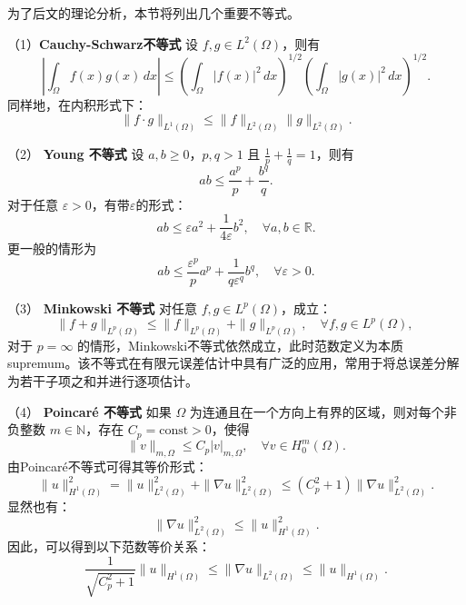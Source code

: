 \documentclass{GZUbachelorthesis}
\theoremstyle{chineseplain}
\begin{document}
为了后文的理论分析，本节将列出几个重要不等式\cite{Wang2004,li2023shuxuewuli}。

（1）\textbf{Cauchy-Schwarz不等式 } \enspace
设 \(f, g \in L^2(\Omega)\)，则有
\begin{equation}
	\left| \int_{\Omega} f(x) g(x) \, dx \right| 
	\leq \left( \int_{\Omega} |f(x)|^2 \, dx \right)^{1/2} 
	\left( \int_{\Omega} |g(x)|^2 \, dx \right)^{1/2}.
	\label{eq:cauchy1}
\end{equation}
同样地，在内积形式下：
\begin{equation}
	\|f \cdot g\|_{L^1(\Omega)} \leq \|f\|_{L^2(\Omega)} \|g\|_{L^2(\Omega)}.
	\label{eq:cauchy2}
\end{equation}

（2） \textbf{Young 不等式 } \enspace
设 \(a, b \geq 0\)，\(p, q > 1\) 且 \(\frac{1}{p} + \frac{1}{q} = 1\)，则有
\begin{equation}
	ab \leq \frac{a^p}{p} + \frac{b^q}{q}.
	\label{eq:young1}
\end{equation}
对于任意 \(\varepsilon > 0\)，有带\(\varepsilon\)的形式：
\[
ab \leq \varepsilon a^2 + \frac{1}{4\varepsilon} b^2, \quad \forall a, b \in \mathbb{R}.
\]
更一般的情形为
\begin{equation}
	ab \leq \frac{\varepsilon^p}{p} a^p + \frac{1}{q \varepsilon^q} b^q, \quad \forall \varepsilon > 0.
	\label{eq:young3}
\end{equation}

（3） \textbf{Minkowski 不等式 } \enspace
对任意 \(f, g \in L^p(\Omega)\)，成立：
\begin{equation}
	\|f + g\|_{L^p(\Omega)} \leq \|f\|_{L^p(\Omega)} + \|g\|_{L^p(\Omega)}, \quad \forall f, g \in L^p(\Omega),\ 
	\label{eq:minkowski}
\end{equation}
对于 \(p = \infty\) 的情形，Minkowski不等式依然成立，此时范数定义为本质supremum。该不等式在有限元误差估计中具有广泛的应用，常用于将总误差分解为若干子项之和并进行逐项估计。

（4） \textbf{Poincaré 不等式 } \enspace
如果 \(\Omega\) 为连通且在一个方向上有界的区域，则对每个非负整数 \(m \in \mathbb{N}\)，存在 \(C_p=\text{const} > 0\)，使得
\begin{equation}
	\|v\|_{m,\Omega} \leq C_p |v|_{m,\Omega}, \quad \forall v \in H_0^m(\Omega).
	\label{eq:poincare1}
\end{equation}
由Poincaré不等式可得其等价形式：
\[
\|u\|_{H^1(\Omega)}^2 = \|u\|_{L^2(\Omega)}^2 + \|\nabla u\|_{L^2(\Omega)}^2 \leq (C_p^2 + 1) \|\nabla u\|_{L^2(\Omega)}^2.
\]
显然也有：
\[	
\|\nabla u\|_{L^2(\Omega)}^2 \leq \|u\|_{H^1(\Omega)}^2.
\]
因此，可以得到以下范数等价关系：
\begin{equation}
	\frac{1}{\sqrt{C_p^2 + 1}} \|u\|_{H^1(\Omega)} \leq \|\nabla u\|_{L^2(\Omega)} \leq \|u\|_{H^1(\Omega)}.
	\label{eq:poincare4}
\end{equation}
\end{document}

